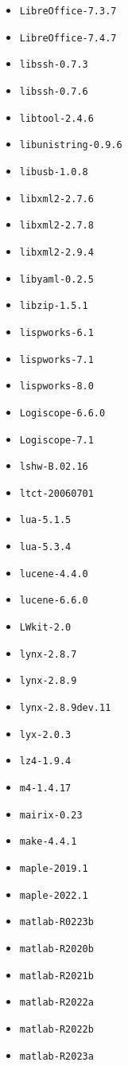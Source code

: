 \begin{multicols}{3}
\begin{itemize}
\item \verb|LibreOffice-7.3.7|
\item \verb|LibreOffice-7.4.7|
\item \verb|libssh-0.7.3|
\item \verb|libssh-0.7.6|
\item \verb|libtool-2.4.6|
\item \verb|libunistring-0.9.6|
\item \verb|libusb-1.0.8|
\item \verb|libxml2-2.7.6|
\item \verb|libxml2-2.7.8|
\item \verb|libxml2-2.9.4|
\item \verb|libyaml-0.2.5|
\item \verb|libzip-1.5.1|
\item \verb|lispworks-6.1|
\item \verb|lispworks-7.1|
\item \verb|lispworks-8.0|
\item \verb|Logiscope-6.6.0|
\item \verb|Logiscope-7.1|
\item \verb|lshw-B.02.16|
\item \verb|ltct-20060701|
\item \verb|lua-5.1.5|
\item \verb|lua-5.3.4|
\item \verb|lucene-4.4.0|
\item \verb|lucene-6.6.0|
\item \verb|LWkit-2.0|
\item \verb|lynx-2.8.7|
\item \verb|lynx-2.8.9|
\item \verb|lynx-2.8.9dev.11|
\item \verb|lyx-2.0.3|
\item \verb|lz4-1.9.4|
\item \verb|m4-1.4.17|
\item \verb|mairix-0.23|
\item \verb|make-4.4.1|
\item \verb|maple-2019.1|
\item \verb|maple-2022.1|
\item \verb|matlab-R0223b|
\item \verb|matlab-R2020b|
\item \verb|matlab-R2021b|
\item \verb|matlab-R2022a|
\item \verb|matlab-R2022b|
\item \verb|matlab-R2023a|

\end{itemize}
\end{multicols}
